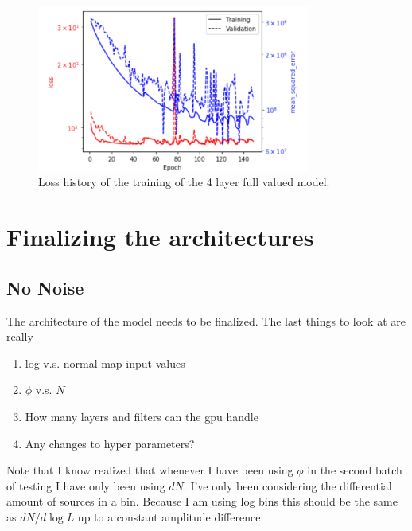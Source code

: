 \documentclass{article}
\begin{document}
			\begin{figure}[H]
				\centering
				\includegraphics[width=0.8\textwidth]{full_lum_4_layer_model_history.pdf}
				\caption{Loss history of the training of the 4 layer full valued model.}
				\label{fig:full_lum_4_layer_model_history}
			\end{figure}

	\section{Finalizing the architectures} \label{sec:arch}
		\subsection{No Noise} \label{sec:third_batch}
			The architecture of the model needs to be finalized.  The last things to look at are really
			\begin{enumerate}
				\item log v.s. normal map input values

				\item \(\phi\) v.s. \(N\)

				\item How many layers and filters can the gpu handle

				\item Any changes to hyper parameters?
			\end{enumerate}

			Note that I know realized that whenever I have been using \(\phi\) in the second batch of testing I have only been using \(dN\).  I've only been considering the differential amount of sources in a bin.  Because I am using log bins this should be the same as \(dN/d\log L\) up to a constant amplitude difference.
\end{document}
